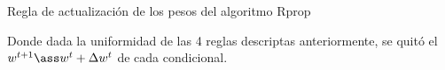 \begin{algorithm}[H]
\caption{Regla de actualización de los pesos del algoritmo Rprop} 
\end{algorithm}
\vspace{10pt}

Donde dada la uniformidad de las 4 reglas descriptas anteriormente, se quitó el $\wtp  \ass \wt + \dwt$ de cada condicional.